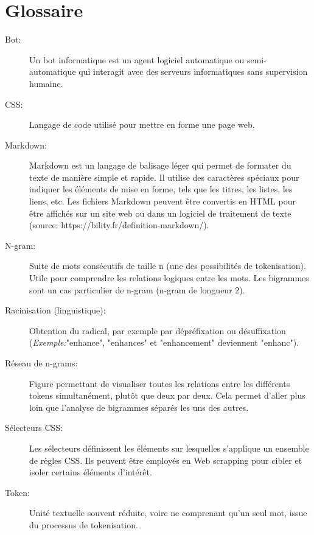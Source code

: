 \documentclass{book}
\begin{document}
\chapter*{Glossaire}
\begin{description}

    \item[Bot:] Un bot informatique est un agent logiciel automatique ou
        semi-automatique qui interagit avec des serveurs informatiques sans supervision
        humaine.

    \item[CSS:] Langage de code utilisé pour mettre en forme une page web.

    \item[Markdown:] Markdown est un langage de balisage léger qui permet de
        formater du texte de manière simple et rapide. Il utilise des caractères
        spéciaux pour indiquer les éléments de mise en forme, tels que les titres, les
        listes, les liens, etc. Les fichiers Markdown peuvent être convertis en HTML
        pour être affichés sur un site web ou dans un logiciel de traitement de texte
        (source: https://bility.fr/definition-markdown/).

    \item[N-gram:] Suite de mots consécutifs de taille n (une des possibilités
        de tokenisation). Utile pour comprendre les relations logiques entre les mots. Les bigrammes sont un cas particulier de n-gram (n-gram de longueur 2).

    \item [Racinisation (linguistique):] Obtention du radical, par exemple par dépréfixation ou désuffixation (\textit{Exemple:}"enhance", "enhances" et "enhancement" deviennent "enhanc").
    
    \item [Réseau de n-grams:] Figure permettant de visualiser toutes les relations entre les différents tokens simultanément, plutôt que deux par deux. Cela permet d'aller plus loin que l'analyse de bigrammes séparés les uns des autres.

    \item[Sélecteurs CSS:] Les sélecteurs définissent les éléments sur
        lesquelles s'applique un ensemble de règles CSS. Ils peuvent être employés en
        Web scrapping pour cibler et isoler certains éléments d'intérêt.

    \item[Token:] Unité textuelle souvent réduite, voire ne comprenant qu'un
        seul mot, issue du processus de tokenisation.


\end{description}
\end{document}
